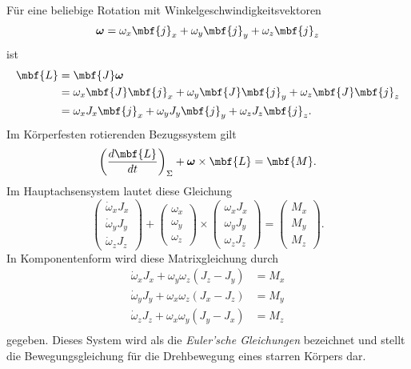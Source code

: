 Für eine beliebige Rotation mit Winkelgeschwindigkeitsvektoren
\begin{equation}
  \boldsymbol{\omega} = \omega_x \mbf{j}_x +\omega_y \mbf{j}_y +\omega_z \mbf{j}_z
\end{equation}
ist 
\begin{equation}
  \begin{split}
    \mbf{L} &= \mbf{J}\boldsymbol{\omega}\\
    &= \omega_x \mbf{J}\mbf{j}_x +\omega_y \mbf{J}\mbf{j}_y +\omega_z \mbf{J}\mbf{j}_z \\
    &= \omega_x J_x\mbf{j}_x +\omega_y J_y\mbf{j}_y +\omega_z J_z\mbf{j}_z.
  \end{split}
\end{equation}
Im Körperfesten rotierenden Bezugssystem gilt
\begin{equation}
  \left(\frac{d\mbf{L}}{dt}\right)_{\Sigma}  + \boldsymbol{\omega}\times \mbf{L} = \mbf{M}.
\end{equation}
Im Hauptachsensystem lautet diese Gleichung
\begin{equation}
  \begin{pmatrix}
    \dot{\omega}_x J_x \\
    \dot{\omega}_y J_y \\
    \dot{\omega}_z J_z 
  \end{pmatrix}
  +
  \begin{pmatrix}
    \omega_x \\
    \omega_y \\
    \omega_z 
  \end{pmatrix}
  \times 
  \begin{pmatrix}
    \omega_x J_x \\
    \omega_y J_y \\
    \omega_z J_z
  \end{pmatrix}
  =
  \begin{pmatrix}
    M_x \\
    M_y \\ 
    M_z
  \end{pmatrix}.
\end{equation}
In Komponentenform wird diese Matrixgleichung durch 
\begin{equation}
  \begin{split}
    \dot{\omega}_x J_x + \omega_y\omega_z(J_z-J_y) &= M_x \\
    \dot{\omega}_y J_y + \omega_x\omega_z(J_x-J_z) &= M_y \\
    \dot{\omega}_z J_z + \omega_x\omega_y(J_y-J_x) &= M_z \\
  \end{split}
\end{equation}
gegeben. Dieses System wird als die \emph{Euler'sche Gleichungen} bezeichnet und stellt die Bewegungsgleichung für die Drehbewegung eines starren Körpers dar. 

